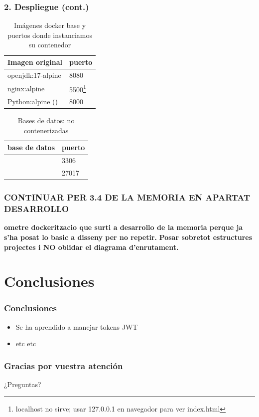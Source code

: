 \documentclass{beamer}
\begin{document}
	
	\begin{frame}
		\frametitle{2. Despliegue (cont.)}
		
		
		\begin{table}[h!]
			\centering
			\begin{tabular}{|l|l|}
				\hline
				\textbf{Imagen original} & \textbf{puerto} \\
				\hline
				
				openjdk:17-alpine & 8080 \\
				nginx:alpine & 5500\footnote{localhost no sirve; usar 127.0.0.1 en navegador para ver index.html} \\
				Python:alpine (\href{https://shorturl.at/YdNuy}{\color{blue}{DF}}) & 8000 \\
		
				\hline
			\end{tabular}
			\caption{Imágenes docker base y puertos donde instanciamos su contenedor}
		\end{table}		
	
	
		\begin{table}[h!]
		\centering
			\begin{tabular}{|l|l|}
				\hline
				\textbf{base de datos} & \textbf{puerto} \\
				\hline
				
				\color{red}{MySQL} & 3306 \\
				\color{red}{MongoDB} & 27017 \\
		
				\hline
			\end{tabular}
			\caption{Bases de datos: no contenerizadas}
		\end{table}		
	\end{frame}
	
	
	
	
	\begin{frame}
		\frametitle{CONTINUAR PER 3.4 DE LA MEMORIA EN APARTAT DESARROLLO}
		\textbf{ometre dockeritzacio que surti a desarrollo de la memoria perque ja s'ha posat lo basic a disseny per no repetir.}
		\textbf{Posar sobretot estructures projectes i NO oblidar el diagrama d'enrutament.}
	\end{frame}
	
	
	
	\section{Conclusiones}
	
	\begin{frame}
		\frametitle{Conclusiones}
		\begin{itemize}
			\item Se ha aprendido a manejar tokens JWT
			\item etc etc
		\end{itemize}
	\end{frame}
	
	\begin{frame}
		\frametitle{Gracias por vuestra atención}
		¿Preguntas?
	\end{frame}
	
\end{document}

